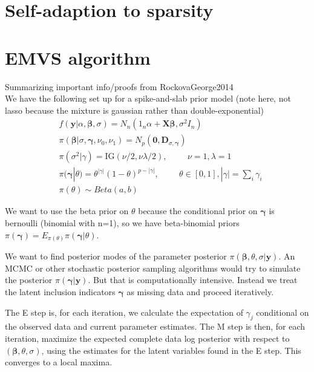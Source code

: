\documentclass[11pt,a4paper]{article}
\begin{document}
\section{Self-adaption to sparsity}

\section{EMVS algorithm}
Summarizing important info/proofs from RockovaGeorge2014\\

We have the following set up for a spike-and-slab prior model (note here, not lasso because the mixture is gaussian rather than double-exponential)
\begin{align*}
    & f(\boldsymbol{y}| \alpha, \boldsymbol{\beta}, \sigma) = N_n(1_n \alpha + \boldsymbol{X}\boldsymbol{\beta}, \sigma^2I_n) \\
    & \pi(\boldsymbol{\beta}|\sigma, \boldsymbol{\gamma}, \nu_0, \nu_1) = N_p(\boldsymbol{0}, \boldsymbol{D}_{\sigma , \boldsymbol{\gamma}})\\
    & \pi(\sigma^2 | \gamma) = \mathrm{IG}(\nu/2, \nu \lambda/2), \hspace{1cm} \nu = 1, \lambda = 1\\
    & \pi(\boldsymbol{\gamma}|\theta)  = \theta^{|\gamma|}(1-\theta)^{p-|\gamma|}, \hspace{1cm} \theta \in [0,1], |\gamma| = \sum_{i}\gamma_i\\
    & \pi(\theta) \sim Beta(a,b)
\end{align*}

We want to use the beta prior on $\theta$ because the conditional prior on $\boldsymbol{\gamma}$ is bernoulli (binomial with n=1), so we have beta-binomial priors $\pi(\boldsymbol{\gamma}) = E_{\pi(\theta)}\pi(\boldsymbol{\gamma}|\theta)$.

We want to find posterior modes of the parameter posterior $\pi(\boldsymbol{\beta}, \theta, \sigma | \boldsymbol{y})$. An MCMC or other stochastic posterior sampling algorithms would try to simulate the posterior $\pi(\boldsymbol{\gamma}|\boldsymbol{y})$. But that is computationally intensive. Instead we treat the latent inclusion indicators $\boldsymbol{\gamma}$ as missing data and proceed iteratively. 

The E step is, for each iteration, we calculate the expectation of $\gamma_j$ conditional on the observed data and current parameter estimates. The M step is then, for each iteration, maximize the expected complete data log posterior with respect to $(\boldsymbol{\beta}, \theta, \sigma)$, using the estimates for the latent variables found in the E step. This converges to a local maxima.
\end{document}
